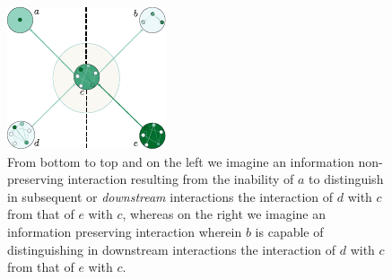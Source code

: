 \begin{frame}
\begin{figure}
\noindent\includegraphics[width=0.5\framewidth]{fig/infopres.pdf}
\caption{From bottom to top and on the left we imagine an information non-preserving interaction resulting from the inability of $a$ to distinguish in subsequent or {\it downstream} interactions the interaction of $d$  with $c$ from that of $e$ with $c$, whereas on the right we imagine an information preserving interaction wherein $b$ is capable of distinguishing in downstream interactions the interaction of $d$  with $c$ from that of $e$ with $c$.}
\label{fig:infopres}
\end{figure}
\end{frame}